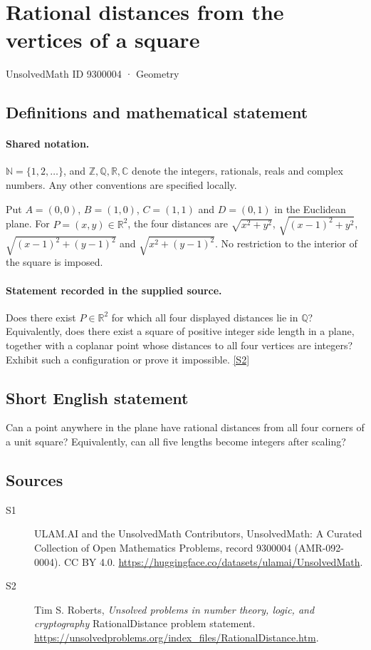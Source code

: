 \documentclass[11pt]{article}
\newcommand{\sref}[2]{\hyperlink{source:#1:#2}{[S#2]}}
\begin{document}
\setcounter{section}{9300003}
\section{Rational distances from the vertices of a square}\label{9300004}
{\small\sffamily UnsolvedMath ID 9300004 · Geometry}
\subsection{Definitions and mathematical statement}

\paragraph{Shared notation.}$\mathbb N=\{1,2,\ldots\}$, and $\mathbb Z,\mathbb Q,\mathbb R,\mathbb C$ denote the integers, rationals, reals and complex numbers. Any other conventions are specified locally.


Put $A=(0,0)$, $B=(1,0)$, $C=(1,1)$ and $D=(0,1)$ in the Euclidean plane. For $P=(x,y)\in\mathbb R^2$, the four distances are $\sqrt{x^2+y^2}$, $\sqrt{(x-1)^2+y^2}$, $\sqrt{(x-1)^2+(y-1)^2}$ and $\sqrt{x^2+(y-1)^2}$. No restriction to the interior of the square is imposed.
\paragraph{Statement recorded in the supplied source.}
Does there exist $P\in\mathbb R^2$ for which all four displayed distances lie in $\mathbb Q$? Equivalently, does there exist a square of positive integer side length in a plane, together with a coplanar point whose distances to all four vertices are integers? Exhibit such a configuration or prove it impossible. \sref{9300004}{2}
\subsection{Short English statement}
Can a point anywhere in the plane have rational distances from all four corners of a unit square? Equivalently, can all five lengths become integers after scaling?
\subsection{Sources}
\begin{description}
\item[\hypertarget{source:9300004:1}{S1}] ULAM.AI and the UnsolvedMath Contributors, UnsolvedMath: A Curated Collection of Open Mathematics Problems, record 9300004 (AMR-092-0004). CC BY 4.0. \url{https://huggingface.co/datasets/ulamai/UnsolvedMath}.
\item[\hypertarget{source:9300004:2}{S2}] Tim S. Roberts, \emph{Unsolved problems in number theory, logic, and cryptography} RationalDistance problem statement. \url{https://unsolvedproblems.org/index_files/RationalDistance.htm}.
\end{description}
\label{end:9300004}
\end{document}
